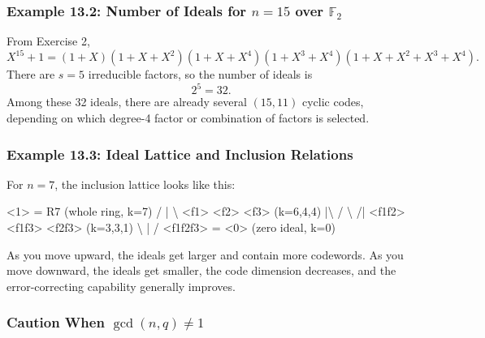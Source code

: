 \documentclass[
]{article}
\newenvironment{Shaded}{}{}
\newcommand{\NormalTok}[1]{#1}
\begin{document}
\subsubsection{\texorpdfstring{Example 13.2: Number of Ideals for
\(n=15\) over
\(\mathbb{F}_2\)}{Example 13.2: Number of Ideals for n=15 over \textbackslash mathbb\{F\}\_2}}\label{example-13.2-number-of-ideals-for-n15-over-mathbbf_2}

From Exercise 2,
\[X^{15}+1 = (1+X)(1+X+X^2)(1+X+X^4)(1+X^3+X^4)(1+X+X^2+X^3+X^4).\]
There are \(s=5\) irreducible factors, so the number of ideals is
\[2^5=32.\] Among these 32 ideals, there are already several \((15,11)\)
cyclic codes, depending on which degree-4 factor or combination of
factors is selected.

\subsubsection{Example 13.3: Ideal Lattice and Inclusion
Relations}\label{example-13.3-ideal-lattice-and-inclusion-relations}

For \(n=7\), the inclusion lattice looks like this:

\begin{Shaded}
\begin{Highlighting}[]
\NormalTok{        \textless{}1\textgreater{} = R7  (whole ring, k=7)}
\NormalTok{       / |  \textbackslash{}}
\NormalTok{   \textless{}f1\textgreater{} \textless{}f2\textgreater{} \textless{}f3\textgreater{}   (k=6,4,4)}
\NormalTok{     |\textbackslash{} / \textbackslash{} /|}
\NormalTok{  \textless{}f1f2\textgreater{} \textless{}f1f3\textgreater{} \textless{}f2f3\textgreater{}  (k=3,3,1)}
\NormalTok{       \textbackslash{}  |  /}
\NormalTok{      \textless{}f1f2f3\textgreater{} = \textless{}0\textgreater{}  (zero ideal, k=0)}
\end{Highlighting}
\end{Shaded}

As you move upward, the ideals get larger and contain more codewords. As
you move downward, the ideals get smaller, the code dimension decreases,
and the error-correcting capability generally improves.

\subsubsection{\texorpdfstring{Caution When
\(\gcd(n,q) \neq 1\)}{Caution When \textbackslash gcd(n,q) \textbackslash neq 1}}\label{caution-when-gcdnq-neq-1}
\end{document}
